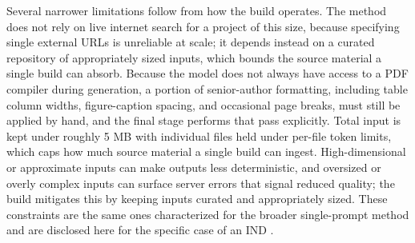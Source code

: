 Several narrower limitations follow from how the build operates. The method does not
rely on live internet search for a project of this size, because specifying single
external URLs is unreliable at scale; it depends instead on a curated repository of
appropriately sized inputs, which bounds the source material a single build can
absorb. Because the model does not always have access to a PDF compiler during
generation, a portion of senior-author formatting, including table column widths,
figure-caption spacing, and occasional page breaks, must still be applied by hand,
and the final stage performs that pass explicitly. Total input is kept under roughly
5 MB with individual files held under per-file token limits, which caps how much
source material a single build can ingest. High-dimensional or approximate inputs
can make outputs less deterministic, and oversized or overly complex inputs can
surface server errors that signal reduced quality; the build mitigates this by
keeping inputs curated and appropriately sized. These constraints are the same ones
characterized for the broader single-prompt method and are disclosed here for the
specific case of an IND \cite{ichpaistduni, chatgpt100kp, llmcomp16fda}.

